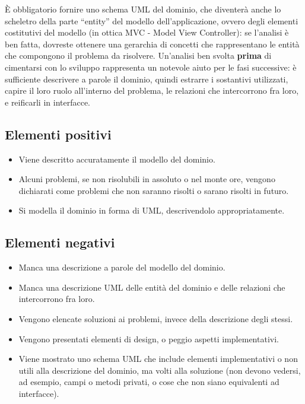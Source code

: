 \documentclass[a4paper,12pt]{report}
\begin{document}
È obbligatorio fornire uno schema UML del dominio, che diventerà anche lo scheletro della 
parte ``entity'' del modello dell'applicazione, ovvero degli elementi costitutivi del modello (in ottica MVC - Model View Controller): se l'analisi è ben fatta, dovreste ottenere una gerarchia di concetti che rappresentano le entità che compongono il problema da risolvere.
%
Un'analisi ben svolta \textbf{prima} di cimentarsi con lo sviluppo rappresenta un notevole aiuto per 
le fasi successive: è sufficiente descrivere a parole il dominio, quindi estrarre i sostantivi 
utilizzati, capire il loro ruolo all'interno del problema, le relazioni che intercorrono fra loro, e 
reificarli in interfacce.

\subsection*{Elementi positivi}
\begin{itemize}
	\item Viene descritto accuratamente il modello del dominio.
	\item Alcuni problemi, se non risolubili in assoluto o nel monte ore, vengono dichiarati come problemi che non saranno risolti o sarano risolti in futuro.
	\item Si modella il dominio in forma di UML, descrivendolo appropriatamente.
\end{itemize}

\subsection*{Elementi negativi}
\begin{itemize}
	\item Manca una descrizione a parole del modello del dominio.
	\item Manca una descrizione UML delle entità del dominio e delle relazioni che intercorrono fra loro.
	\item Vengono elencate soluzioni ai problemi, invece della descrizione degli stessi.
	\item Vengono presentati elementi di design, o peggio aspetti implementativi.
	\item Viene mostrato uno schema UML che include elementi implementativi o non utili alla descrizione del dominio, ma volti alla soluzione (non devono vedersi, ad esempio, campi o metodi privati, o cose che non siano equivalenti ad interfacce).
\end{itemize}
\end{document}
